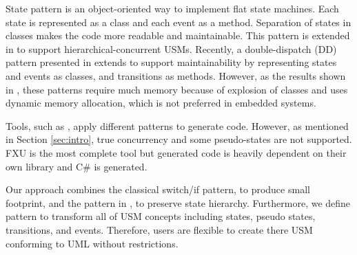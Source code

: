 State pattern \cite{Shalyto2006,Douglass1999} is an object-oriented way to implement flat state machines. Each state is represented as a class and each event as a method. %
Separation of states in classes makes the code more readable and maintainable. %
This pattern is extended in \cite{niaz_mapping_2004} to support hierarchical-concurrent USMs. 
Recently, a double-dispatch (DD) pattern presented in \cite{spinke_object-oriented_2013} extends \cite{niaz_mapping_2004} to support maintainability by %
representing states and events as classes, and transitions as methods. 
However, as the results shown in \cite{spinke_object-oriented_2013}, these patterns require much memory because of explosion of classes and uses dynamic memory allocation, which is not preferred in embedded systems.

Tools, such as \cite{ibm_rhapsody, sparxsystems_enterprise_2014}, apply different patterns to generate code. 
However, as mentioned in Section \ref{sec:intro}, true concurrency and some pseudo-states are not supported. 
FXU \cite{Pilitowski2007} is the most complete tool but generated code is heavily dependent on their own library and C\# is generated.

Our approach combines the classical switch/if pattern, to produce small footprint, and the pattern in \cite{niaz_mapping_2004}, to preserve state hierarchy.
Furthermore, we define pattern to transform all of USM concepts including states, pseudo states, transitions, and events.
Therefore, users are flexible to create there USM conforming to UML without restrictions.

